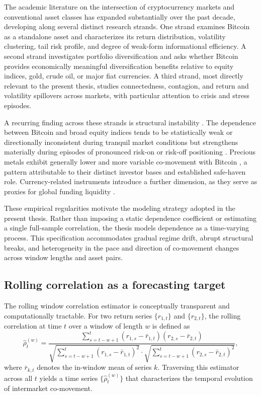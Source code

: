 The academic literature on the intersection of cryptocurrency markets and conventional asset classes has expanded substantially over the past decade, developing along several distinct research strands. One strand examines Bitcoin as a standalone asset and characterizes its return distribution, volatility clustering, tail risk profile, and degree of weak-form informational efficiency. A second strand investigates portfolio diversification and asks whether Bitcoin provides economically meaningful diversification benefits relative to equity indices, gold, crude oil, or major fiat currencies. A third strand, most directly relevant to the present thesis, studies connectedness, contagion, and return and volatility spillovers across markets, with particular attention to crisis and stress episodes.

A recurring finding across these strands is structural instability \citep{bouri2017hedge, corbet2018exploring}. The dependence between Bitcoin and broad equity indices tends to be statistically weak or directionally inconsistent during tranquil market conditions but strengthens materially during episodes of pronounced risk-on or risk-off positioning \citep{ji2018network, kristoufek2015main}. Precious metals exhibit generally lower and more variable co-movement with Bitcoin \citep{dyhrberg2016bitcoin, klein2018bitcoin}, a pattern attributable to their distinct investor bases and established safe-haven role. Currency-related instruments introduce a further dimension, as they serve as proxies for global funding liquidity \citep{corbet2018exploring}.

These empirical regularities motivate the modeling strategy adopted in the present thesis. Rather than imposing a static dependence coefficient or estimating a single full-sample correlation, the thesis models dependence as a time-varying process. This specification accommodates gradual regime drift, abrupt structural breaks, and heterogeneity in the pace and direction of co-movement changes across window lengths and asset pairs.

\subsection{Rolling correlation as a forecasting target}

The rolling window correlation estimator is conceptually transparent and computationally tractable. For two return series $\{r_{1,t}\}$ and $\{r_{2,t}\}$, the rolling correlation at time $t$ over a window of length $w$ is defined as
\begin{equation}
    \hat{\rho}_{t}^{(w)} = \frac{\sum_{s=t-w+1}^{t}(r_{1,s} - \bar{r}_{1,t})(r_{2,s} - \bar{r}_{2,t})}
    {\sqrt{\sum_{s=t-w+1}^{t}(r_{1,s} - \bar{r}_{1,t})^{2}} \cdot
     \sqrt{\sum_{s=t-w+1}^{t}(r_{2,s} - \bar{r}_{2,t})^{2}}},
\end{equation}
where $\bar{r}_{k,t}$ denotes the in-window mean of series $k$. Traversing this estimator across all $t$ yields a time series $\{\hat{\rho}_{t}^{(w)}\}$ that characterizes the temporal evolution of intermarket co-movement.

